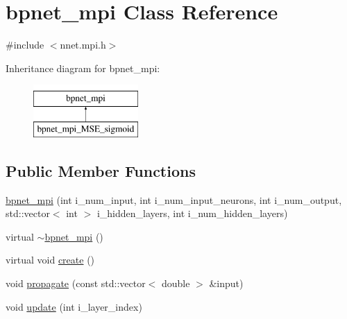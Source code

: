 \hypertarget{classbpnet__mpi}{\section{bpnet\-\_\-mpi Class Reference}
\label{classbpnet__mpi}
}


{\ttfamily \#include $<$nnet.\-mpi.\-h$>$}

Inheritance diagram for bpnet\-\_\-mpi\-:\begin{figure}[H]
\begin{center}
\leavevmode
\includegraphics[height=2.000000cm]{classbpnet__mpi}
\end{center}
\end{figure}
\subsection*{Public Member Functions}
\begin{DoxyCompactItemize}
\item 
\hyperlink{classbpnet__mpi_a4b808fe251cffa351e0312ed0f523942}{bpnet\-\_\-mpi} (int i\-\_\-num\-\_\-input, int i\-\_\-num\-\_\-input\-\_\-neurons, int i\-\_\-num\-\_\-output, std\-::vector$<$ int $>$ i\-\_\-hidden\-\_\-layers, int i\-\_\-num\-\_\-hidden\-\_\-layers)
\item 
virtual \hyperlink{classbpnet__mpi_a98f24d482ceb4e5df576c8110fb4d8a4}{$\sim$bpnet\-\_\-mpi} ()
\item 
virtual void \hyperlink{classbpnet__mpi_a734df7a0c8e6f65ceb6613729cbfae31}{create} ()
\item 
void \hyperlink{classbpnet__mpi_af584e64c3a0ed4bd91436c50a1009ba4}{propagate} (const std\-::vector$<$ double $>$ \&input)
\item 
void \hyperlink{classbpnet__mpi_aada732a042e36b5cad8e7b14946c09df}{update} (int i\-\_\-layer\-\_\-index)
\end{DoxyCompactItemize}
